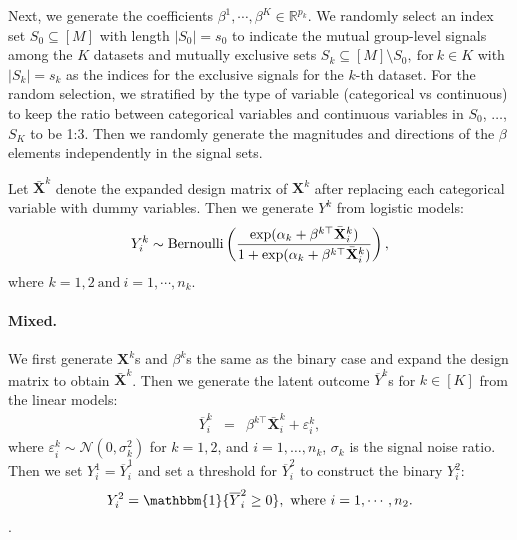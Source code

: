 \documentclass[11pt]{article}
\theoremstyle{plain}
\theoremstyle{definition}
\theoremstyle{remark}
\def\R{\mathbb{R}}
\def\R{\mathbb{R}}
\newcommand{\X}{\mathbf{X}}
\newcommand{\0}{\mathbf{0}}
\begin{document}
Next, we generate the coefficients $\beta^1, \cdots, \beta^K \in \R^{p_k}$. We randomly select an index set $S_0 \subseteq[M]$ with length $|S_0|=s_0$ to indicate the mutual group-level signals among the $K$ datasets and mutually exclusive sets $S_k \subseteq [M]\setminus S_0, ~\text{for}~ k \in K$ with $|S_k| = s_k$ as the indices for the exclusive signals for the $k$-th dataset. For the random selection, we stratified by the type of variable (categorical vs continuous) to keep the ratio between categorical variables and continuous variables in $S_0$, $\dots$, $S_K$ to be 1:3. Then we randomly generate the magnitudes and directions of the $\beta$ elements independently in the signal sets. %


Let $\bar{\X}^k$ denote the expanded design matrix of $\X^k$ after replacing each categorical variable with dummy variables. Then we generate $Y^k$ from logistic models: 
\begin{eqnarray*}
Y^k_{i}\sim \textnormal{Bernoulli} \left(\frac{\exp(\alpha_k+\beta^{k\top}\bar{\X}^k_{i})}{1+\exp(\alpha_k+\beta^{k\top}\bar{\X}^k_{i})}\right),
\end{eqnarray*}
where $k=1,2~\text{and}~ i=1,\cdots, n_k$. 

\paragraph{Mixed.} We first generate $\X^k$s and $\beta^k$s the same as the binary case and expand the design matrix to obtain $\bar{\X}^k$. Then we generate the latent outcome $\overline{Y}^k$s for $k \in [K]$ from the linear models:
\begin{eqnarray*}
\overline{Y}^k_{i}&=&\beta^{k\top}\bar{\X}^k_{i}+\varepsilon^k_{i},
\end{eqnarray*}
where $\varepsilon_i^k\sim \mathcal{N}(0,\sigma_k^2)$ for $k=1,2$, and $i=1,\dots,n_k$, $\sigma_k$ is the signal noise ratio. Then we set $Y_i^1=\overline{Y}_i^1$ and set a threshold for $\overline{Y}_i^2$ to construct the binary $Y_i^2$: \[Y^2_{i} = \mathbbm{1}\{\overline{Y}^2_{i} \geq 0\}, ~\text{where}~i=1,\cdots,n_2.\]. 
\end{document}
